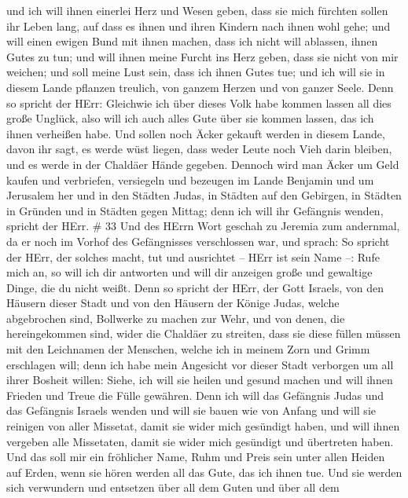  und ich will ihnen einerlei Herz und Wesen geben, dass sie
mich fürchten sollen ihr Leben lang, auf dass es ihnen und ihren Kindern
nach ihnen wohl gehe;  und will einen ewigen Bund mit ihnen
machen, dass ich nicht will ablassen, ihnen Gutes zu tun; und will ihnen
meine Furcht ins Herz geben, dass sie nicht von mir weichen;
 und soll meine Lust sein, dass ich ihnen Gutes tue; und
ich will sie in diesem Lande pflanzen treulich, von ganzem Herzen und
von ganzer Seele.  Denn so spricht der HErr: Gleichwie ich
über dieses Volk habe kommen lassen all dies große Unglück, also will
ich auch alles Gute über sie kommen lassen, das ich ihnen verheißen
habe.  Und sollen noch Äcker gekauft werden in diesem
Lande, davon ihr sagt, es werde wüst liegen, dass weder Leute noch Vieh
darin bleiben, und es werde in der Chaldäer Hände gegeben. 
Dennoch wird man Äcker um Geld kaufen und verbriefen, versiegeln und
bezeugen im Lande Benjamin und um Jerusalem her und in den Städten
Judas, in Städten auf den Gebirgen, in Städten in Gründen und in Städten
gegen Mittag; denn ich will ihr Gefängnis wenden, spricht der HErr. \#
33  Und des HErrn Wort geschah zu Jeremia zum andernmal, da
er noch im Vorhof des Gefängnisses verschlossen war, und sprach:
 So spricht der HErr, der solches macht, tut und ausrichtet
-- HErr ist sein Name --:  Rufe mich an, so will ich dir
antworten und will dir anzeigen große und gewaltige Dinge, die du nicht
weißt.  Denn so spricht der HErr, der Gott Israels, von den
Häusern dieser Stadt und von den Häusern der Könige Judas, welche
abgebrochen sind, Bollwerke zu machen zur Wehr,  und von
denen, die hereingekommen sind, wider die Chaldäer zu streiten, dass sie
diese füllen müssen mit den Leichnamen der Menschen, welche ich in
meinem Zorn und Grimm erschlagen will; denn ich habe mein Angesicht vor
dieser Stadt verborgen um all ihrer Bosheit willen:  Siehe,
ich will sie heilen und gesund machen und will ihnen Frieden und Treue
die Fülle gewähren.  Denn ich will das Gefängnis Judas und
das Gefängnis Israels wenden und will sie bauen wie von Anfang
 und will sie reinigen von aller Missetat, damit sie wider
mich gesündigt haben, und will ihnen vergeben alle Missetaten, damit sie
wider mich gesündigt und übertreten haben.  Und das soll mir
ein fröhlicher Name, Ruhm und Preis sein unter allen Heiden auf Erden,
wenn sie hören werden all das Gute, das ich ihnen tue. Und sie werden
sich verwundern und entsetzen über all dem Guten und über all dem

